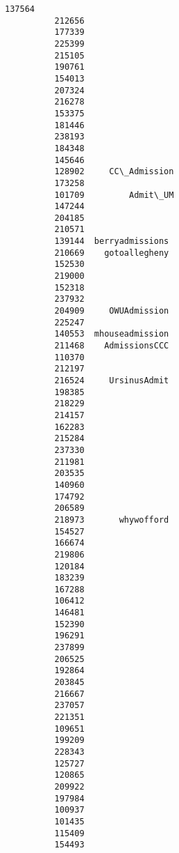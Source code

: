 \documentclass[11pt]{article}
\begin{document}
\begin{Verbatim}[commandchars=\\\{\}]
          137564                   
          212656                   
          177339                   
          225399                   
          215105                   
          190761                   
          154013                   
          207324                   
          216278                   
          153375                   
          181446                   
          238193                   
          184348                   
          145646                   
          128902     CC\_Admission  
          173258                   
          101709         Admit\_UM  
          147244                   
          204185                   
          210571                   
          139144  berryadmissions  
          210669    gotoallegheny  
          152530                   
          219000                   
          152318                   
          237932                   
          204909     OWUAdmission  
          225247                   
          140553  mhouseadmission  
          211468    AdmissionsCCC  
          110370                   
          212197                   
          216524     UrsinusAdmit  
          198385                   
          218229                   
          214157                   
          162283                   
          215284                   
          237330                   
          211981                   
          203535                   
          140960                   
          174792                   
          206589                   
          218973       whywofford  
          154527                   
          166674                   
          219806                   
          120184                   
          183239                   
          167288                   
          106412                   
          146481                   
          152390                   
          196291                   
          237899                   
          206525                   
          192864                   
          203845                   
          216667                   
          237057                   
          221351                   
          109651                   
          199209                   
          228343                   
          125727                   
          120865                   
          209922                   
          197984                   
          100937                   
          101435                   
          115409                   
          154493                   

\end{Verbatim}
\end{document}
